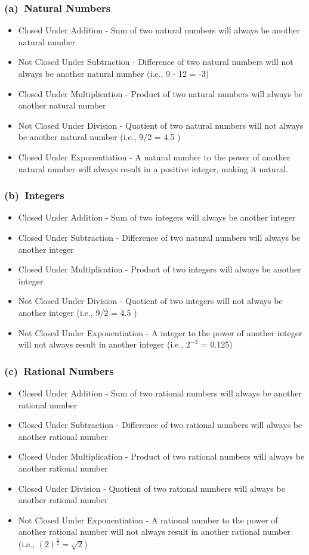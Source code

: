\documentclass[11pt]{article}
\begin{document}
\begin{itemize}
  \subsubsection*{(a)~Natural Numbers}
  \begin{itemize}
    \item Closed Under Addition - Sum of two natural numbers will always be another natural number
    \item Not Closed Under Subtraction - Difference of two natural numbers will not always be another natural number (i.e., 9 - 12 = -3)
    \item Closed Under Multiplication - Product of two natural numbers will always be another natural number
    \item Not Closed Under Division - Quotient of two natural numbers will not always be another natural number (i.e., 9/2 = 4.5 )
    \item Closed Under Exponentiation - A natural number to the power of another natural number will always result in a positive integer, making it natural.
  \end{itemize}
  \subsubsection*{(b)~Integers}
  \begin{itemize}
    \item Closed Under Addition - Sum of two integers will always be another integer
    \item Closed Under Subtraction - Difference of two natural numbers will always be another integer
    \item Closed Under Multiplication - Product of two integers will always be another integer
    \item Not Closed Under Division - Quotient of two integers will not always be another integer (i.e., 9/2 = 4.5 )
    \item Not Closed Under Exponentiation - A integer to the power of another integer will not always result in another integer (i.e., \(2^{-3}\) = 0.125)
  \end{itemize}
  \subsubsection*{(c)~Rational Numbers}
  \begin{itemize}
    \item Closed Under Addition - Sum of two rational numbers will always be another rational number
    \item Closed Under Subtraction - Difference of two rational numbers will always be another rational number
    \item Closed Under Multiplication - Product of two rational numbers will always be another rational number 
    \item Closed Under Division - Quotient of two rational numbers will always be another rational number
    \item Not Closed Under Exponentiation - A rational number to the power of another rational number will not always result in another rational number (i.e., \(\left(2\right)^{\frac{1}{2}} = \sqrt{2}\))
  \end{itemize}

\end{itemize}
\end{document}
